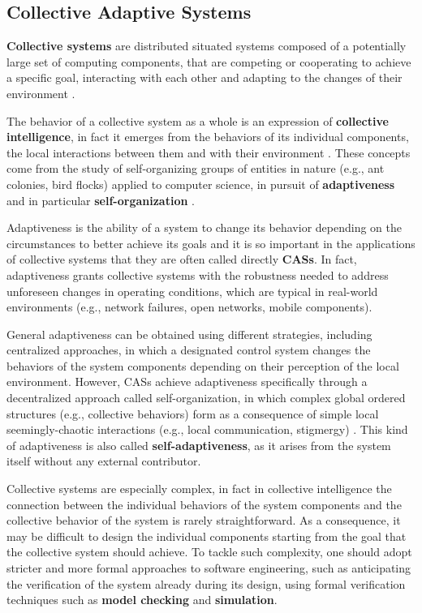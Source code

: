 
\subsection{Collective Adaptive Systems}
\label{section:background:concepts:cas}

\textbf{Collective systems} are distributed situated systems composed of a
potentially large set of computing components, that are competing or cooperating
to achieve a specific goal, interacting with each other and adapting to the
changes of their environment \cite{CAS}.

The behavior of a collective system as a whole is an expression of
\textbf{collective intelligence}, in fact it emerges from the behaviors of its
individual components, the local interactions between them and with their
environment \cite{CollectiveIntelligence}. These concepts come from the study
of self-organizing groups of entities in nature (e.g., ant colonies, bird
flocks) applied to computer science, in pursuit of \textbf{adaptiveness} and in
particular \textbf{self-organization} \cite{SwarmIntelligence}.

Adaptiveness is the ability of a system to change its behavior depending on the
circumstances to better achieve its goals and it is so important in the
applications of collective systems that they are often called directly
\textbf{\acp{CAS}}. In fact, adaptiveness grants collective systems with the
robustness needed to address unforeseen changes in operating conditions, which
are typical in real-world environments (e.g., network failures, open networks,
mobile components).

General adaptiveness can be obtained using different strategies, including
centralized approaches, in which a designated control system changes the
behaviors of the system components depending on their perception of the local
environment. However, \acp{CAS} achieve adaptiveness specifically through a
decentralized approach called self-organization, in which complex global
ordered structures (e.g., collective behaviors) form as a consequence of simple
local seemingly-chaotic interactions (e.g., local communication, stigmergy)
\cite{SelfOrganization}. This kind of adaptiveness is also called
\textbf{self-adaptiveness}, as it arises from the system itself without any
external contributor.

Collective systems are especially complex, in fact in collective intelligence
the connection between the individual behaviors of the system components and
the collective behavior of the system is rarely straightforward. As a
consequence, it may be difficult to design the individual components starting
from the goal that the collective system should achieve. To tackle such
complexity, one should adopt stricter and more formal approaches to software
engineering, such as anticipating the verification of the system already during
its design, using formal verification techniques such as \textbf{model
checking} and \textbf{simulation}.

